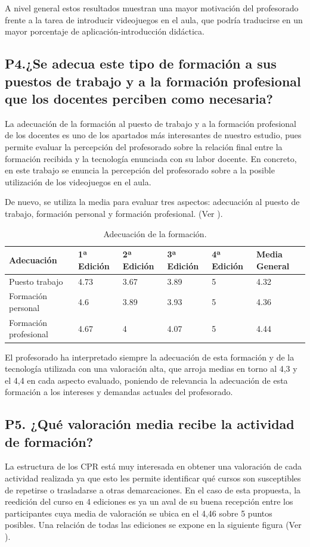 \documentclass[spanish]{textolivre}
\begin{document}
A nivel general estos resultados muestran una mayor motivación del profesorado frente a la tarea de introducir videojuegos en el aula, que podría traducirse en un mayor porcentaje de aplicación-introducción didáctica.

\subsection{P4.¿Se adecua este tipo de formación a sus puestos de trabajo y a la formación profesional que los docentes perciben como necesaria?}\label{sec-format-simple}
La adecuación de la formación al puesto de trabajo y a la formación profesional de los docentes es uno de los apartados más interesantes de nuestro estudio, pues permite evaluar la percepción del profesorado sobre la relación final entre la formación recibida y la tecnología enunciada con su labor docente. En concreto, en este trabajo se enuncia la percepción del profesorado sobre a la posible utilización de los videojuegos en el aula.

De nuevo, se utiliza la media para evaluar tres aspectos: adecuación al puesto de trabajo, formación personal y formación profesional. (Ver ).

\begin{table}[htbp]
\caption{Adecuación de la formación.}
\label{tbl3}
\centering
\begin{tabular}{llllll}
\toprule
Adecuación & 1ª Edición & 2ª Edición & 3ª Edición & 4ª Edición & Media General \\ 
 \midrule
Puesto trabajo & 4.73 & 3.67 & 3.89 & 5 & 4.32 \\
Formación personal & 4.6 & 3.89 & 3.93 & 5 & 4.36 \\
Formación profesional & 4.67 & 4 & 4.07 & 5 & 4.44 \\
\bottomrule
\end{tabular}
\end{table}

El profesorado ha interpretado siempre la adecuación de esta formación y de la tecnología utilizada con una valoración alta, que arroja medias en torno al 4,3 y el 4,4 en cada aspecto evaluado, poniendo de relevancia la adecuación de esta formación a los intereses y demandas actuales del profesorado.

\subsection{P5. ¿Qué valoración media recibe la actividad de formación?}\label{sec-links}
La estructura de los CPR está muy interesada en obtener una valoración de cada actividad realizada ya que esto les permite identificar qué cursos son susceptibles de repetirse o trasladarse a otras demarcaciones. En el caso de esta propuesta, la reedición del curso en 4 ediciones es ya un aval de su buena recepción entre los participantes cuya media de valoración se ubica en el 4,46 sobre 5 puntos posibles. Una relación de todas las ediciones se expone en la siguiente figura (Ver ).
\end{document}
